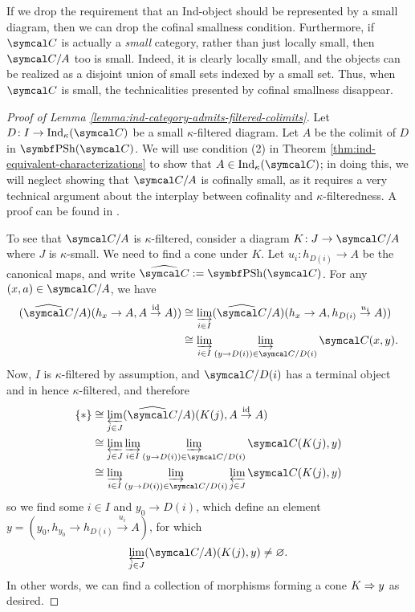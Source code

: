 \begin{remark}
	If we drop the requirement that an Ind-object should be represented by a small diagram, then we can drop the cofinal smallness condition. Furthermore, if \(\calC\) is
	actually a \emph{small} category, rather than just locally small, then \(\calC/A\) too is small. Indeed, it is clearly locally small, and the objects can be realized
	as a disjoint union of small sets indexed by a small set. Thus, when \(\calC\) is small, the technicalities presented by cofinal smallness disappear.
\end{remark}

\begin{proof}[Proof of Lemma \ref{lemma:ind-category-admits-filtered-colimits}]
Let \(D\!:I\to\Ind_\kappa(\calC)\) be a small \(\kappa\)-filtered diagram. Let \(A\) be the colimit of \(D\) in \(\PSh(\calC)\).
We will use condition (2) in Theorem \ref{thm:ind-equivalent-characterizations} to show that \(A\in\Ind_\kappa(\calC)\); in doing this, we will neglect showing that \(\calC/A\) is
cofinally small, as it requires a very technical argument about the interplay between cofinality and \(\kappa\)-filteredness. A proof can be found in \cite[Thm.\ 6.1.8]{kashiwara-schapira-book}.

To see that \(\calC/A\) is \(\kappa\)-filtered, consider a diagram \(K\!:J\to\calC/A\) where \(J\) is \(\kappa\)-small. We need to find a cone under \(K\).
Let \(u_i\!:h_{D(i)}\to A\) be the canonical maps, and write \(\widehat{\calC} := \PSh(\calC)\). For any \((x,a)\in\calC/A\), we have
\begin{align*}
	(\widehat{\calC}/A)(h_x\to A,A\overset{\id}\to A)) &\cong \injlim_{i\in I}(\widehat{\calC}/A)(h_x\to A,h_{D(i)}\overset{u_i}\to A))\\
	&\cong \injlim_{i\in I}\injlim_{(y\to D(i))\in\calC/D(i)}\calC(x,y).
\end{align*}
Now, \(I\) is \(\kappa\)-filtered by assumption, and \(\calC/D(i)\) has a terminal object and in hence \(\kappa\)-filtered, and therefore
\begin{align*}
	\{*\} &\cong \projlim_{j\in J}(\widehat{\calC}/A)(K(j),A\overset{\id}\to A) \\
	&\cong \projlim_{j\in J}\injlim_{i\in I}\injlim_{(y\to D(i))\in\calC/D(i)}\calC(K(j),y) \\
	&\cong \injlim_{i\in I}\injlim_{(y\to D(i))\in\calC/D(i)}\projlim_{j\in J}\calC(K(j),y) \\
\end{align*}
so we find some \(i\in I\) and \(y_0\to D(i)\), which define an element \(y = (y_0, h_{y_0}\to h_{D(i)}\overset{u_i}\to A)\), for which
\[ \projlim_{j\in J}(\calC/A)(K(j),y) \not= \varnothing. \]
In other words, we can find a collection of morphisms forming a cone \(K\Rightarrow y\) as desired.
\end{proof}

